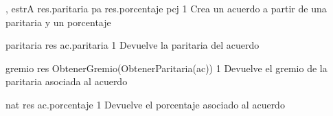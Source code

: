{, }{estrA}
{
	\state res.paritaria \asig pa								
	\state res.porcentaje \asig pcj								
}
{1}
{Crea un acuerdo a partir de una paritaria y un porcentaje}

{}{paritaria}
{
	\state res \asig ac.paritaria 								
}
{1}
{Devuelve la paritaria del acuerdo}

{}{gremio}
{
	\state res \asig ObtenerGremio(ObtenerParitaria(ac)) 		
}
{1}
{Devuelve el gremio de la paritaria asociada al acuerdo}

{}{nat}
{
	\state res \asig ac.porcentaje		
}
{1}
{Devuelve el porcentaje asociado al acuerdo}